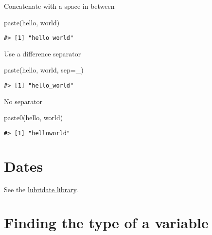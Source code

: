 \documentclass[
]{book}
\newenvironment{Shaded}{\begin{snugshade}}{\end{snugshade}}
\newcommand{\AttributeTok}[1]{\textcolor[rgb]{0.77,0.63,0.00}{#1}}
\newcommand{\FunctionTok}[1]{\textcolor[rgb]{0.00,0.00,0.00}{#1}}
\newcommand{\NormalTok}[1]{#1}
\newcommand{\StringTok}[1]{\textcolor[rgb]{0.31,0.60,0.02}{#1}}
\begin{document}
Concatenate with a space in between

\begin{Shaded}
\begin{Highlighting}[]
\FunctionTok{paste}\NormalTok{(}\StringTok{\textquotesingle{}hello\textquotesingle{}}\NormalTok{, }\StringTok{\textquotesingle{}world\textquotesingle{}}\NormalTok{)}
\end{Highlighting}
\end{Shaded}

\begin{verbatim}
#> [1] "hello world"
\end{verbatim}

Use a difference separator

\begin{Shaded}
\begin{Highlighting}[]
\FunctionTok{paste}\NormalTok{(}\StringTok{\textquotesingle{}hello\textquotesingle{}}\NormalTok{, }\StringTok{\textquotesingle{}world\textquotesingle{}}\NormalTok{, }\AttributeTok{sep=}\StringTok{\textquotesingle{}\_\textquotesingle{}}\NormalTok{)}
\end{Highlighting}
\end{Shaded}

\begin{verbatim}
#> [1] "hello_world"
\end{verbatim}

No separator

\begin{Shaded}
\begin{Highlighting}[]
\FunctionTok{paste0}\NormalTok{(}\StringTok{\textquotesingle{}hello\textquotesingle{}}\NormalTok{, }\StringTok{\textquotesingle{}world\textquotesingle{}}\NormalTok{)}
\end{Highlighting}
\end{Shaded}

\begin{verbatim}
#> [1] "helloworld"
\end{verbatim}

\hypertarget{dates}{%
\section{Dates}\label{dates}}

See the \href{https://lubridate.tidyverse.org/}{lubridate library}.

\hypertarget{finding-the-type-of-a-variable}{%
\section{Finding the type of a variable}\label{finding-the-type-of-a-variable}}
\end{document}
